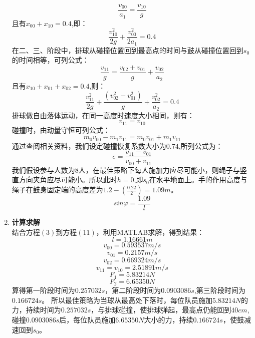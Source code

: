 \documentclass{cumcm}
\begin{document}
\begin{enumerate}
\begin{equation}
\frac{v_{00}}{a_1}=\frac{v_{10}}{g}
\end{equation}
且有$x_{00}+x_{10}=0.4$,即：
\begin{equation}
\frac{v^2_{10}}{2g}+\frac{v^2_{00}}{2a_1}=0.4
\end{equation}
在二、三、阶段中，排球从碰撞位置回到最高点的时间与鼓从碰撞位置回到$s_0$的时间相等，可列公式：
\begin{equation}
\frac{v_{11}}{g}=\frac{v_{02}+v_{01}}{g}+\frac{v_{02}}{a_2}
\end{equation}
且有$x_{10}+x_{01}+x_{02}=0.4$,则：
\begin{equation}
\frac{v^2_{11}}{2g}+\frac{(v^2_{02}-v^2_{01})}{g}+\frac{v^2_{02}}{a_2}=0.4
\end{equation}
排球做自由落体运动，在同一高度时速度大小相同，则有：
\begin{equation}
v_{11}=v_{10}
\end{equation}
碰撞时，由动量守恒可列公式：
\begin{equation}
m_0v_{00}-m_1v_{11}=m_0v_{01}+m_1v_{11}
\end{equation}
通过查阅相关资料，我们设定碰撞恢复系数大小为$0.74$,所列公式为：
\begin{equation}
e=\frac{v_{11}-v_{01}}{v_{00}+v_{11}}
\end{equation}
我们假设参与人数为$8$人，在最佳策略下每人施加力应尽可能小，则绳子与竖直方向夹角应尽可能小。所以此时$h=0$,即$s_0$在水平地面上。手的作用高度与绳子在鼓身固定端的高度差为$1.2-(\frac{0.22}{2})=1.09m$。
\begin{equation}
sin\varphi=\frac{1.09}{l}
\end{equation}
\item \textbf{计算求解}\\
结合方程$(3)$到方程$(11)$，利用MATLAB求解，得到结果：
$$l=1.16661m$$
$$v_{00}=0.593537m/s$$
$$v_{01}=0.2157m/s$$
$$v_{02}=0.669324m/s$$
$$v_{11}=v_{10}=2.51891m/s$$
$$F_1=5.83214N$$ 
$$F_2=6.65350N$$
\quad \quad
算得第一阶段时间为$0.257032s$，第二阶段时间为$0.0903086s$,第三阶段时间为$0.166724s$。
所以最佳策略为当球从最高处下落时，每位队员施加$5.83214N$的力，持续时间为$0.257032s$，与排球碰撞，使排球弹起，最高点仍能回到$40cm$,碰撞$0.0903086s$后，每位队员施加$6.65350N$大小的力，持续$0.166724s$，使鼓减速回到$s_0$。

\end{enumerate}
\end{document}
